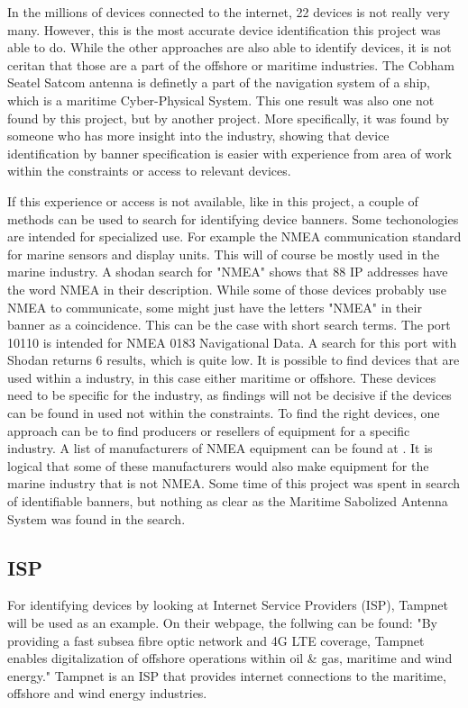 In the millions of devices connected to the internet, 22 devices is not really very many. However, this is the most accurate device identification this project was able to do. While the other approaches are also able to identify devices, it is not ceritan that those are a part of the offshore or maritime industries. The Cobham Seatel Satcom antenna is definetly a part of the navigation system of a ship, which is a maritime Cyber-Physical System. This one result was also one not found by this project, but by another project. More specifically, it was found by someone who has more insight into the industry, showing that device identification by banner specification is easier with experience from area of work within the constraints or access to relevant devices.

If this experience or access is not available, like in this project, a couple of methods can be used to search for identifying device banners. 
Some techonologies are intended for specialized use. For example the NMEA communication standard for marine sensors and display units. \cite{NMEA} This will of course be mostly used in the marine industry. A shodan search for "NMEA" shows that 88 IP addresses have the word NMEA in their description. While some of those devices probably use NMEA to communicate, some might just have the letters "NMEA" in their banner as a coincidence. This can be the case with short search terms. The port 10110 is intended for NMEA 0183 Navigational Data. \cite{www_ports} A search for this port with Shodan returns 6 results, which is quite low. 
It is possible to find devices that are used within a industry, in this case either maritime or offshore. These devices need to be specific for the industry, as findings will not be decisive if the devices can be found in used not within the constraints. To find the right devices, one approach can be to find producers or resellers of equipment for a specific industry. A list of manufacturers of NMEA equipment can be found at \cite{NMEA}. It is logical that some of these manufacturers would also make equipment for the marine industry that is not NMEA. 
Some time of this project was spent in search of identifiable banners, but nothing as clear as the Maritime Sabolized Antenna System was found in the search. 


\subsection{ISP}
For identifying devices by looking at Internet Service Providers (ISP), Tampnet will be used as an example. On their webpage, the follwing can be found: "By providing a fast subsea fibre optic network and 4G LTE coverage, Tampnet enables digitalization of offshore operations within oil \& gas, maritime and wind energy." \cite{tampnet} Tampnet is an ISP that provides internet connections to the maritime, offshore and wind energy industries. 

